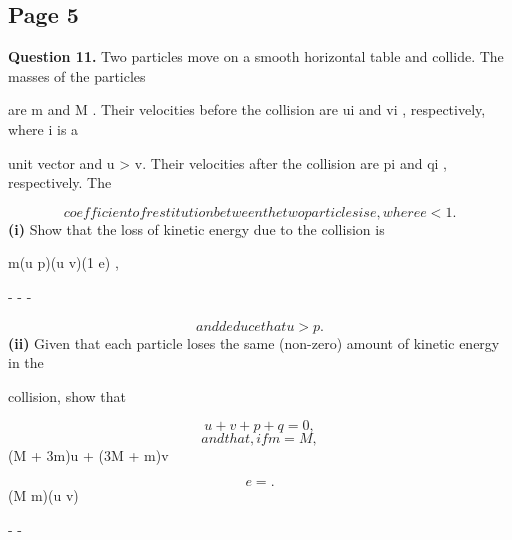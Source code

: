 \documentclass[12pt]{article}
\begin{document}
\subsection*{Page 5}
\begin{flushleft}
\bigskip\textbf{Question 11.} Two particles move on a smooth horizontal table and collide. The masses of the particles\par
are m and M . Their velocities before the collision are ui and vi , respectively, where i is a\par
unit vector and u > v. Their velocities after the collision are pi and qi , respectively. The\par
\[coefficient of restitution between the two particles is e, where e < 1.\]
\textbf{(i)} Show that the loss of kinetic energy due to the collision is\par
m(u p)(u v)(1 e) ,\par
- - -\par
\[and deduce that u > p.\]
\textbf{(ii)} Given that each particle loses the same (non-zero) amount of kinetic energy in the\par
collision, show that\par
\[u + v + p + q = 0 ,\]
\[and that, if m = M ,\]
(M + 3m)u + (3M + m)v\par
\[e = .\]
(M m)(u v)\par
- -\par
\end{flushleft}
\end{document}
